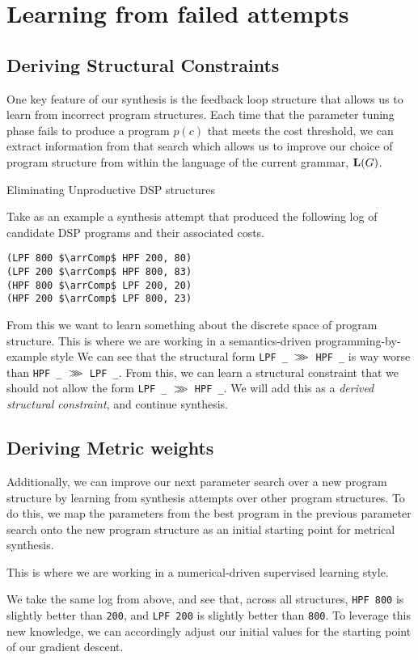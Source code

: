 \section{Learning from failed attempts}
\label{sec:feedback}


\subsection{Deriving Structural Constraints}
One key feature of our synthesis is the feedback loop structure that allows us to learn from incorrect program structures.
Each time that the parameter tuning phase fails to produce a program $p(c)$ that meets the cost threshold, we can extract information from that search which allows us to improve our choice of program structure from within the language of the current grammar, $\mathbf{L}(G)$.


\begin{exmp} Eliminating Unproductive DSP structures

Take as an example a synthesis attempt that produced the following log of candidate DSP programs and their associated costs.

\begin{lstlisting}
(LPF 800 $\arrComp$ HPF 200, 80)
(LPF 200 $\arrComp$ HPF 800, 83)
(HPF 800 $\arrComp$ LPF 200, 20)
(HPF 200 $\arrComp$ LPF 800, 23)
\end{lstlisting}

From this we want to learn something about the discrete space of program structure. 
This is where we are working in a semantics-driven programming-by-example style
We can see that the structural form \texttt{LPF \_ $>\mkern-9mu>\mkern-9mu>$ HPF \_} is way worse than \texttt{HPF \_ $>\mkern-9mu>\mkern-9mu>$ LPF \_}.
From this, we can learn a structural constraint that we should not allow the form \texttt{LPF \_ $>\mkern-9mu>\mkern-9mu>$ HPF \_}.
We will add this as a \textit{derived structural constraint}, and continue synthesis.
\end{exmp}

\subsection{Deriving Metric weights}
Additionally, we can improve our next parameter search over a new program structure by learning from synthesis attempts over other program structures.
To do this, we map the parameters from the best program in the previous parameter search onto the new program structure as an initial starting point for metrical synthesis.

This is where we are working in a numerical-driven supervised learning style.

\begin{exmp}
We take the same log from above, and see that, across all structures, \texttt{HPF 800} is slightly better than \texttt{200}, 
  and \texttt{LPF 200} is slightly better than \texttt{800}.
To leverage this new knowledge, we can accordingly adjust our initial values for the starting point of our gradient descent.
\end{exmp}
